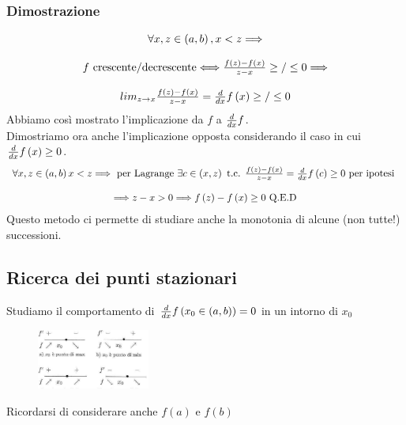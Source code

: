 \documentclass{report}
\begin{document}
        \subsubsection{Dimostrazione}
            $$\begin{array}{c}
                \forall x, z \in \left(a, b\right), x < z \Longrightarrow \\ \\
                f \textrm{ crescente/decrescente} \Longleftrightarrow \frac{f\left(z\right) - f\left(x\right)}{z - x} \geq/\leq 0   \Longrightarrow \\ \\
                lim_{z \to x} \frac{f\left(z\right) - f\left(x\right)}{z - x} = \D{x}f\left(x\right) \geq/\leq 0
            \end{array}$$
            Abbiamo così mostrato l'implicazione da $f$ a $\D{x}f$. \\
            Dimostriamo ora anche l'implicazione opposta considerando il caso in cui $\D{x}f\left(x\right) \geq 0$.
            $$\begin{array}{c}
                \forall x, z \in \left(a, b\right) x < z \Longrightarrow \textrm{ per Lagrange } \exists c \in \left(x, z\right) 
                \textrm{ t.c. } \frac{f\left(z\right) - f\left(x\right)}{z - x} = \D{x}f\left(c\right) \geq 0 \textrm{ per ipotesi }  \\ \\
                \Longrightarrow z - x > 0 \Longrightarrow f\left(z\right) - f\left(x\right) \geq 0 \textrm{ Q.E.D}
            \end{array}$$
            Questo metodo ci permette di studiare anche la monotonia di alcune (non tutte!) successioni. 
    \subsection{Ricerca dei punti stazionari}
        Studiamo il comportamento di $\D{x}f\left(x_0 \in \left(a, b\right)\right) = 0$ in un intorno di $x_0$
        \begin{center}
            \begin{figure}[H]
                \includegraphics[width = 0.33\textwidth, height = 0.33\textwidth]{dermaxmin.png}
            \end{figure}
        \end{center}
        Ricordarsi di considerare anche $f\left(a\right)$ e $f\left(b\right)$
\end{document}
